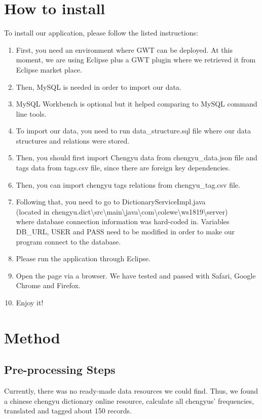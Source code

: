 \documentclass[11pt]{article} %
\begin{document}
\section{How to install}
To install our application, please follow the listed instructions:

\begin{enumerate}
  \item First, you need an environment where GWT can be deployed. At this moment, we are using Eclipse plus a GWT plugin where we retrieved it from Eclipse market place.
  \item Then, MySQL is needed in order to import our data.
  \item MySQL Workbench is optional but it helped comparing to MySQL command line tools.
  \item To import our data, you need to run data\_structure.sql file where our data structures and relations were stored.
  \item Then, you should first import Chengyu data from chengyu\_data.json file and tags data from tags.csv file, since there are foreign key dependencies.
  \item Then, you can import chengyu tags relations from chengyu\_tag.csv file.
  \item Following that, you need to go to DictionaryServiceImpl.java \\(located in chengyu.dict\textbackslash src\textbackslash main\textbackslash java\textbackslash com\textbackslash colewe\textbackslash ws1819\textbackslash server)\\ where database connection information was hard-coded in. Variables DB\_URL, USER and PASS need to be modified in order to make our program connect to the database.
  \item Please run the application through Eclipse.
  \item Open the page  via a browser. We have tested and passed with Safari, Google Chrome and Firefox.
  \item Enjoy it!
\end{enumerate}

\section{Method}
\subsection{Pre-processing Steps}
\indent Currently, there was no ready-made data resources we could find. Thus, we found a chinese chengyu dictionary online resource, calculate all chengyus' frequencies, translated and tagged about 150 records.
\end{document}
